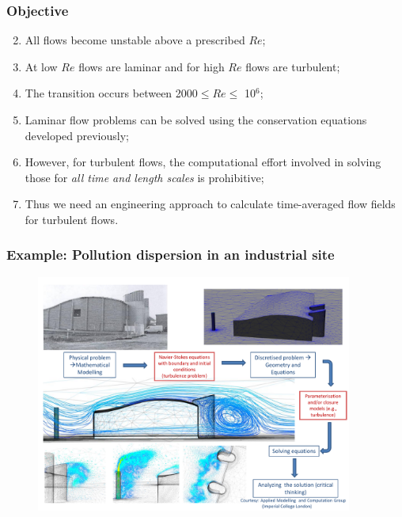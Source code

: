 \documentclass[10pt,compress]{beamer}
\begin{document}
\begin{frame}
 \frametitle{Objective}
     \begin{enumerate}\setcounter{enumi}{1}%
       \item<1-> All flows become unstable above a prescribed $Re$;
       \item<1-> At low $Re$ flows are laminar and for high $Re$ flows are turbulent;
       \item<1-> The transition occurs between 2000$\leq Re \leq$ 10$^{6}$;
       \item<2-> Laminar flow problems can be solved using the conservation equations developed previously;
       \item<2-> However, for turbulent flows, the computational effort involved in solving those for {\it all time and length scales} is prohibitive;
       \item<3-> Thus we need an engineering approach to calculate time-averaged flow fields for turbulent flows.
     \end{enumerate} 
\end{frame}

\begin{frame}
 \frametitle{Example: Pollution dispersion in an industrial site}

   \begin{figure}%
    \begin{center}
     \includegraphics[width=12.cm, height=7.8cm, clip]{./Figs/SpecificIndustrialEnvironmentalApplication.pdf}
    \end{center}
   \end{figure}    
\end{frame}


\end{document}
